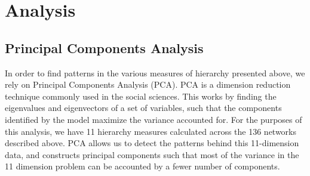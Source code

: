 \documentclass[3p,times]{elsarticle}
\begin{document}
%





\section{Analysis}
\label{sec:analysis}


\subsection{Principal Components Analysis}
In order to find patterns in the various measures of hierarchy presented above, we rely on Principal Components Analysis (PCA). PCA is a dimension reduction technique commonly used in the social sciences. This works by finding the eigenvalues and eigenvectors of a set of variables, such that the components identified by the model maximize the variance accounted for. For the purposes of this analysis, we have 11 hierarchy measures calculated across the 136 networks described above. PCA allows us to detect the patterns behind this 11-dimension data, and constructs principal components such that most of the variance in the 11 dimension problem can be accounted by a fewer number of components.
\end{document}
